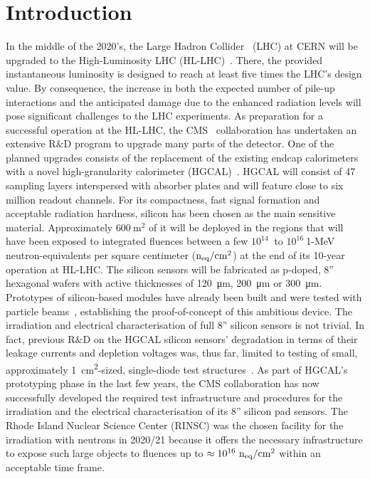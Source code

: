 \section{Introduction}
\label{sec:introduction}
In the middle of the 2020's, the Large Hadron Collider~\cite{evans:2008} (LHC) at CERN will be upgraded to the High-Luminosity LHC (HL-LHC)~\cite{hl-lhc-tdr:2017}.
There, the provided instantaneous luminosity is designed to reach at least five times the LHC's design value.
By consequence, the increase in both the expected number of pile-up interactions and the anticipated damage due to the enhanced radiation levels will pose significant challenges to the LHC experiments.
As preparation for a successful operation at the HL-LHC, the CMS~\cite{cms:2008} collaboration has undertaken an extensive R$\&$D program to upgrade many parts of the detector.
One of the planned upgrades consists of the replacement of the existing endcap calorimeters with a novel high-granularity calorimeter (HGCAL)~\cite{hgcal-tdr:2018}.
HGCAL will consist of 47 sampling layers interspersed with absorber plates and will feature close to six million readout channels.
For its compactness, fast signal formation and acceptable radiation hardness, silicon has been chosen as the main sensitive material.
Approximately $\SI{600}{\metre\squared}$ of it will be deployed in the regions that will have been exposed to integrated fluences between a few $10^{14}~$ to $10^{16}~$1-MeV neutron-equivalents per square centimeter ($\mathrm{n_{eq}}/\mathrm{cm}^{2}$) at the end of its 10-year operation at HL-LHC. 
The silicon sensors will be fabricated as p-doped, 8'' hexagonal wafers with active thicknesses of \SI{120}{\micro\metre}, \SI{200}{\micro\metre} or \SI{300}{\micro\metre}.
Prototypes of silicon-based modules have already been built and were tested with particle beams~\cite{cms_hgc-2016-beamtests,H1:2020,H2:2020,H3:2021}, establishing the proof-of-concept of this ambitious device.
The irradiation and electrical characterisation of full 8'' silicon sensors is not trivial.
In fact, previous R$\&$D on the HGCAL silicon sensors' degradation in terms of their leakage currents and depletion voltages was, thus far, limited to testing of small, approximately \SI{1}{\centi\metre\squared}-sized, single-diode test structures~\cite{Curr_s_2017,Akchurin:2020}.
As part of HGCAL's prototyping phase in the last few years, the CMS collaboration has now successfully developed the required test infrastructure and procedures for the irradiation and the electrical characterisation of its 8'' silicon pad sensors.
The Rhode Island Nuclear Science Center (RINSC) was the chosen facility for the irradiation with neutrons in 2020/21 because it offers the necessary infrastructure to expose such large objects to fluences up to $\approx 10^{16}~\mathrm{n_{eq}}/\mathrm{cm}^{2}$ within an acceptable time frame.
